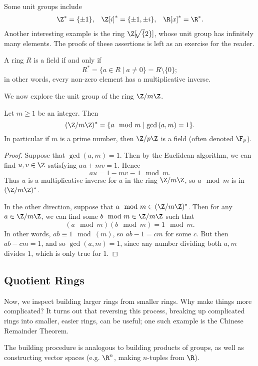 \documentclass[math1530-lecture-notes]{subfiles}
\begin{document}
\begin{example}
  Some unit groups include
  \begin{align*}
    \Z^*=\{ \pm 1 \}, && \Z[i]^*=\{ \pm 1,\pm i \}, && \R[x]^*=\R^*
  .\end{align*} Another interesting example is the ring $\Z[\sqrt[]{2} ]$, whose unit group has
  infinitely many elements. The proofs of these assertions is left as an exercise for the reader.
\end{example}

\begin{example}
  A ring $R$ is a field if and only if \[
    R^* = \{a\in R\mid a\neq 0\} = R \setminus \{ 0 \}
  ;\] in other words, every non-zero element has a multiplicative inverse.
\end{example}

We now explore the unit group of the ring $\Z / m\Z$.
\begin{proposition}[]{}
  Let $m\ge 1$ be an integer. Then \[
    (\Z / m\Z)^* = \{a\mod{m}\mid \gcd{(a,m)}=1\} 
  .\] In particular if $m$ is a prime number, then $\Z / p\Z$ is a field (often denoted $\F_p$).
\end{proposition}
\begin{proof}[Proof]
  Suppose that $\gcd{(a,m)}=1$. Then by the Euclidean algorithm, we can find $u,v\in \Z$ satisfying
  $au+mv=1$. Hence \[
    au = 1-mv \equiv 1 \mod{m}
  .\] Thus $u$ is a multiplicative inverse for $a$ in the ring $\Z / m\Z$, so $a\mod{m}$ is in $(\Z
  / m\Z)^*$.

  In the other direction, suppose that $a\mod{m}\in (\Z / m\Z)^*$. Then for any $a\in \Z / m\Z$, we
  can find some $b\mod{m}\in \Z / m\Z$ such that \[
    (a\mod{m})(b\mod{m})=1\mod{m}
  .\] In other words, $ab\equiv 1\mod{(m)}$, so $ab-1=cm$ for some $c$. But then $ab-cm=1$, and so
  $\gcd{(a,m)}=1$, since any number dividing both $a,m$ divides $1$, which is only true for $1$.
\end{proof}


\subsection{Quotient Rings}

Now, we inspect building larger rings from smaller rings. Why make things more complicated? It turns
out that reversing this process, breaking up complicated rings into smaller, easier rings, can be
useful; one such example is the Chinese Remainder Theorem.

The building procedure is analogous to building products of groups, as well as constructing vector
spaces (e.g. $\R^{n}$, making $n$-tuples from $\R$).
\end{document}
